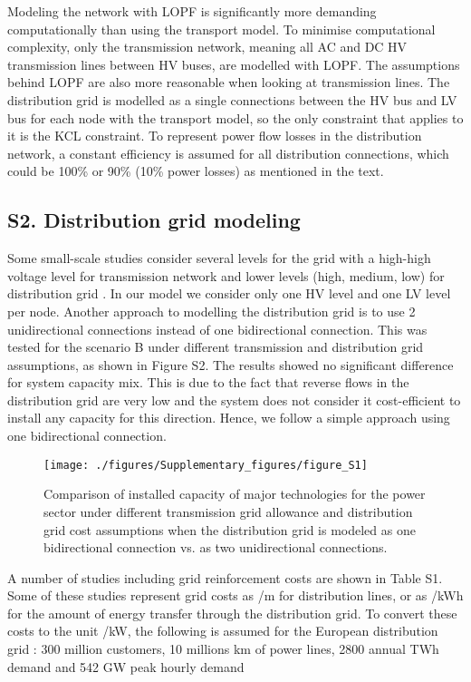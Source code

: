 Modeling the network with LOPF is significantly more demanding computationally than using the transport model. To minimise computational complexity, only the transmission network, meaning all AC and DC HV transmission lines between HV buses, are modelled with LOPF. The assumptions behind LOPF are also more reasonable when looking at transmission lines. The distribution grid is modelled as a single connections between the HV bus and LV bus for each node with the transport model, so the only constraint that applies to it is the KCL constraint. To represent power flow losses in the distribution network, a constant efficiency is assumed for all distribution connections, which could be 100\% or 90\% (10\% power losses) as mentioned in the text. 

 
\subsection*{S2. Distribution grid modeling}

Some small-scale studies consider several levels for the grid with a high-high voltage level for transmission network and lower levels (high, medium, low) for distribution grid . In our model we consider only one HV level and one LV level per node. Another approach to modelling the distribution grid is to use 2 unidirectional connections instead of one bidirectional connection. This was tested for the scenario B under different transmission and distribution grid assumptions, as shown in Figure S2. The results showed no significant difference for system capacity mix. This is due to the fact that reverse flows in the distribution grid are very low and the system does not consider it cost-efficient to install any capacity for this direction. Hence, we follow a simple approach using one bidirectional connection.

\begin{figure}[H]
\renewcommand*{\thefigure}{S\arabic{figure}}
\texttt{[image: ./figures/Supplementary\_figures/figure\_S1]}
\caption{Comparison of installed capacity of major technologies for the power sector under different transmission grid allowance and distribution grid cost assumptions when the distribution grid is modeled as one bidirectional connection vs. as two unidirectional connections. }
\end{figure}

A number of studies including grid reinforcement costs are shown in Table S1. Some of these studies represent grid costs as \texteuro /m for distribution lines, or as \texteuro /kWh for the amount of energy transfer through the distribution grid. To convert these costs to the unit \texteuro /kW, the following is assumed for the European distribution grid : 300 million customers, 10 millions km of power lines, 2800 annual TWh demand  and 542 GW peak hourly demand 

